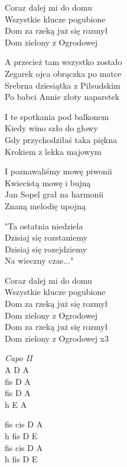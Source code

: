 \begin{text}
    \ifchorded{\hfill\break}
    Coraz dalej mi do domu\\
    Wszystkie klucze pogubione\\
    Dom za rzeką już się rozmył\\
    Dom zielony z Ogrodowej

    A przecież tam wszystko zostało\\
    Zegarek ojca obrączka po matce\\
    Srebrna dziesiątka z Piłsudskim\\
    Po babci Annie złoty naparstek

    I te spotkania pod balkonem\\
    Kiedy wino szło do głowy\\
    Gdy przychodziłaś taka piękna\\
    Krokiem z lekka majowym

    I poznawaliśmy mowę piwonii\\
    Kwiecistą mowę i bujną\\
    Jan Sopel grał na harmonii\\
    Znaną melodię upojną

    "Ta ostatnia niedziela\\
    Dzisiaj się rozstaniemy\\
    Dzisiaj się rozejdziemy\\
    Na wieczny czas..."

    Coraz dalej mi do domu\\
    Wszystkie klucze pogubione\\
    Dom za rzeką już się rozmył\\
    Dom zielony z Ogrodowej\\
    Dom za rzeką już się rozmył\\
    Dom zielony z Ogrodowej x3
\end{text}
\begin{chord}
    \textit{Capo II}\\
    A D A\\
    fis D A\\
    fis D A\\
    h E A

    fis cis D A\\
    h fis D E\\
    fis cis D A\\
    h fis D E
\end{chord}